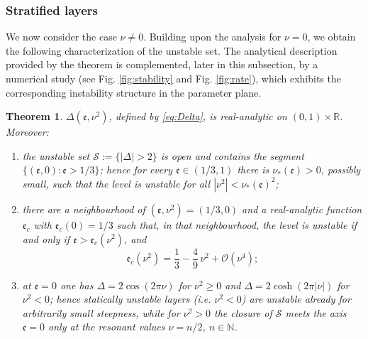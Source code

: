 \documentclass[reqno]{amsart}
\newcommand{\ee}{\mathfrak{e}}
\newtheorem{theorem}{Theorem}
\begin{document}
\subsubsection{Stratified layers}\label{sec_strat}
We now consider the case \(\nu\neq0\). Building upon the analysis for \(\nu=0\), we obtain the following characterization of the unstable set. The analytical description provided by the theorem is complemented, later in this subsection, by a numerical study (see Fig. \ref{fig:stability} and Fig. \ref{fig:rate}), which exhibits the corresponding instability structure in the parameter plane.

\begin{theorem}\label{prop:strat}
$\Delta(\ee,\nu^2)$, defined by \eqref{eq:Delta}, is real-analytic on $(0,1)\times\mathbb R$. Moreover:
\begin{enumerate}
\item[(i)] the unstable set $\mathcal S:=\{|\Delta|>2\}$ is open and contains the segment $\{(\ee,0):\ee>1/3\}$; hence for every $\ee\in(1/3,1)$ there is $\nu_*(\ee)>0$, possibly small, such that the level is unstable for all $|\nu^2|<\nu_*(\ee)^2$;
\item[(ii)] there are a neighbourhood of $(\ee,\nu^2)=(1/3,0)$ and a real-analytic function $\ee_c$ with $\ee_c(0)=1/3$ such that, in that neighbourhood, the level is unstable if and only if $\ee>\ee_c(\nu^2)$, and
\begin{equation}\label{eq:ec}
\ee_c(\nu^2)=\frac{1}{3}-\frac{4}{9}\,\nu^2+\mathcal{O}(\nu^4);
\end{equation}
\item[(iii)] at $\ee=0$ one has $\Delta=2\cos(2\pi\nu)$ for $\nu^2\ge0$ and $\Delta=2\cosh(2\pi|\nu|)$ for $\nu^2<0$; hence statically unstable layers (i.e. $\nu^2<0$) are unstable already for arbitrarily small steepness, while for $\nu^2>0$ the closure of $\mathcal S$ meets the axis $\ee=0$ only at the resonant values $\nu=n/2$, $n\in\mathbb N$.
\end{enumerate}
\end{theorem}
\end{document}
